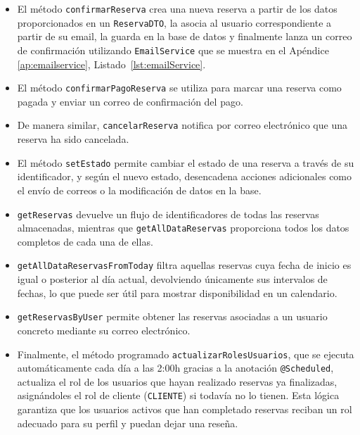 \begin{itemize}
    \item El método \texttt{confirmarReserva} crea una nueva reserva a partir de los datos proporcionados en un \texttt{ReservaDTO}, la asocia al usuario correspondiente a partir de su email, la guarda en la base de datos y finalmente lanza un correo de confirmación utilizando \texttt{EmailService} que se muestra en el Apéndice \ref{ap:emailservice}, Listado~\ref{lst:emailService}.
    
    \item El método \texttt{confirmarPagoReserva} se utiliza para marcar una reserva como pagada y enviar un correo de confirmación del pago. 
    
    \item De manera similar, \texttt{cancelarReserva} notifica por correo electrónico que una reserva ha sido cancelada.

    \item El método \texttt{setEstado} permite cambiar el estado de una reserva a través de su identificador, y según el nuevo estado, desencadena acciones adicionales como el envío de correos o la modificación de datos en la base.

    \item \texttt{getReservas} devuelve un flujo de identificadores de todas las reservas almacenadas, mientras que \texttt{getAllDataReservas} proporciona todos los datos completos de cada una de ellas.

    \item \texttt{getAllDataReservasFromToday} filtra aquellas reservas cuya fecha de inicio es igual o posterior al día actual, devolviendo únicamente sus intervalos de fechas, lo que puede ser útil para mostrar disponibilidad en un calendario.

    \item \texttt{getReservasByUser} permite obtener las reservas asociadas a un usuario concreto mediante su correo electrónico.

    \item Finalmente, el método programado \texttt{actualizarRolesUsuarios}, que se ejecuta automáticamente cada día a las 2:00h gracias a la anotación \texttt{@Scheduled}, actualiza el rol de los usuarios que hayan realizado reservas ya finalizadas, asignándoles el rol de cliente (\texttt{CLIENTE}) si todavía no lo tienen. Esta lógica garantiza que los usuarios activos que han completado reservas reciban un rol adecuado para su perfil y puedan dejar una reseña.
\end{itemize}


